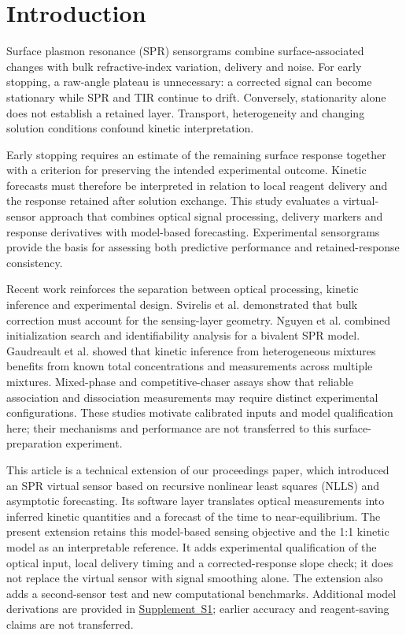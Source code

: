 \documentclass[lettersize,journal]{IEEEtran}
\newcommand{\supp}[1]{\href{SPR_smart_stop_supplement.pdf}{Supplement~#1}}
\begin{document}
\section{Introduction}
Surface plasmon resonance (SPR) sensorgrams combine surface-associated
changes with bulk refractive-index variation, delivery and noise. For early
stopping, a raw-angle plateau is unnecessary: a corrected signal can
become stationary while SPR and TIR continue to drift. Conversely,
stationarity alone does not establish a retained layer. Transport,
heterogeneity and changing solution conditions confound kinetic
interpretation\cite{schuck}.

Early stopping requires an estimate of the remaining surface response
together with a criterion for preserving the intended experimental
outcome. Kinetic forecasts must therefore be interpreted in relation to
local reagent delivery and the response retained after solution exchange.
This study evaluates a virtual-sensor approach that combines optical
signal processing, delivery markers and response derivatives with
model-based forecasting. Experimental sensorgrams provide the basis for
assessing both predictive performance and retained-response consistency.

Recent work reinforces the separation between optical processing, kinetic
inference and experimental design. Svirelis et al. demonstrated that bulk
correction must account for the sensing-layer geometry\cite{bulk2022}.
Nguyen et al. combined initialization search and identifiability analysis
for a bivalent SPR model\cite{nguyen2023}. Gaudreault et al. showed
that kinetic inference from heterogeneous mixtures benefits from known
total concentrations and measurements across multiple
mixtures\cite{gaudreault2021}.
Mixed-phase and competitive-chaser assays show that reliable association
and dissociation measurements may require distinct experimental
configurations\cite{quinn2025,chaser2025}. These studies motivate calibrated
inputs and model qualification here; their mechanisms and performance
are not transferred to this surface-preparation experiment.

This article is a technical extension of our proceedings
paper\cite{melo2026}, which introduced an SPR virtual sensor based on
recursive nonlinear least squares (NLLS) and asymptotic forecasting.
Its software layer translates optical measurements into inferred kinetic
quantities and a forecast of the time to near-equilibrium. The present
extension retains this model-based sensing objective and the 1:1 kinetic
model as an interpretable reference. It adds experimental qualification of
the optical input, local delivery timing and a corrected-response slope
check; it does not replace the virtual sensor with signal smoothing alone.
The extension also adds a second-sensor test and new computational
benchmarks. Additional model derivations are provided in \supp{S1}; earlier
accuracy and reagent-saving claims are not transferred.
\end{document}
